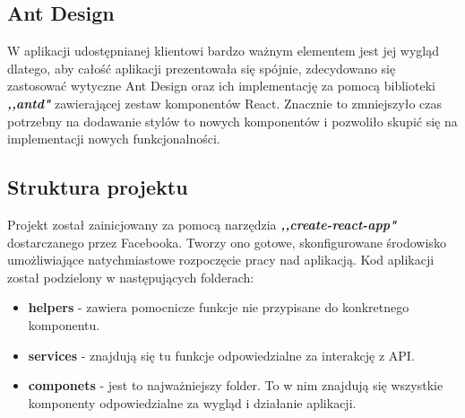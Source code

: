 \documentclass[declaration,shortabstract]{iithesis}
\begin{document}
\subsection{Ant Design}
W aplikacji udostępnianej klientowi bardzo ważnym elementem jest jej wygląd dlatego, aby całość aplikacji prezentowała się spójnie, zdecydowano się zastosować wytyczne Ant Design oraz ich implementację za pomocą biblioteki \textbf{\textit{,,antd"}} zawierającej zestaw komponentów React. Znacznie to zmniejszyło czas potrzebny na dodawanie stylów to nowych komponentów i pozwoliło skupić się na implementacji nowych funkcjonalności. 

\subsection{Struktura projektu}
Projekt został zainicjowany za pomocą narzędzia \textbf{\textit{,,create-react-app"}} dostarczanego przez Facebooka. Tworzy ono gotowe, skonfigurowane środowisko umożliwiające natychmiastowe rozpoczęcie pracy nad aplikacją. Kod aplikacji został podzielony w następujących folderach: 
\begin{itemize}
    \item \textbf{\textunderscore helpers} - zawiera pomocnicze funkcje nie przypisane do konkretnego komponentu.
    \item \textbf{\textunderscore services} - znajdują się tu funkcje odpowiedzialne za interakcję z API.
    \item \textbf{componets} - jest to najważniejszy folder. To w nim znajdują się wszystkie komponenty odpowiedzialne za wygląd i działanie aplikacji.
\end{itemize}
\end{document}
